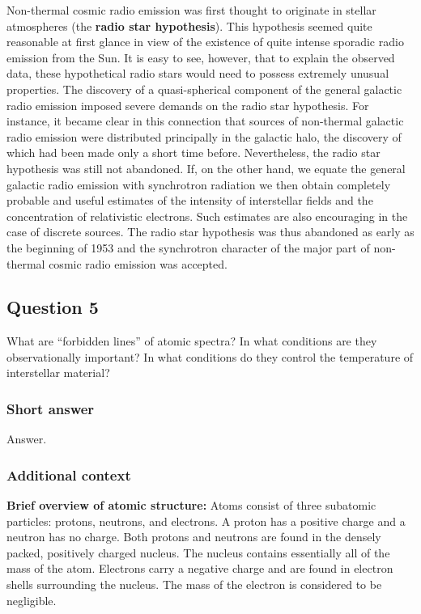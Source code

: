 \documentclass[a4paper,10pt]{article}
\begin{document}
{\noindent}Non-thermal cosmic radio emission was first thought to originate in stellar atmospheres (the \textbf{radio star hypothesis}). This hypothesis seemed quite reasonable at first glance in view of the existence of quite intense sporadic radio emission from the Sun. It is easy to see, however, that to explain the observed data, these hypothetical radio stars would need to possess extremely unusual properties. The discovery of a quasi-spherical component of the general galactic radio emission imposed severe demands on the radio star hypothesis. For instance, it became clear in this connection that sources of non-thermal galactic radio emission were distributed principally in the galactic halo, the discovery of which had been made only a short time before. Nevertheless, the radio star hypothesis was still not abandoned. If, on the other hand, we equate the general galactic radio emission with synchrotron radiation we then obtain completely probable and useful estimates of the intensity of interstellar fields and the concentration of relativistic electrons. Such estimates are also encouraging in the case of discrete sources. The radio star hypothesis was thus abandoned as early as the beginning of 1953 and the synchrotron character of the major part of non-thermal cosmic radio emission was accepted. 


\newpage
\subsection{Question 5}

What are ``forbidden lines'' of atomic spectra? In what conditions are they observationally important? In what conditions do they control the temperature of interstellar material?

\subsubsection{Short answer}

Answer.

\subsubsection{Additional context}

{\noindent}\textbf{Brief overview of atomic structure:} Atoms consist of three subatomic particles: protons, neutrons, and electrons. A proton has a positive charge and a neutron has no charge. Both protons and neutrons are found in the densely packed, positively charged nucleus. The nucleus contains essentially all of the mass of the atom. Electrons carry a negative charge and are found in electron shells surrounding the nucleus. The mass of the electron is considered to be negligible.
\end{document}
